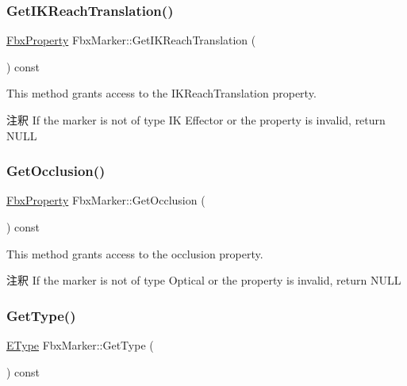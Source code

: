 \subsubsection{\texorpdfstring{Get\+I\+K\+Reach\+Translation()}{GetIKReachTranslation()}}
{\footnotesize\ttfamily \hyperlink{class_fbx_property}{Fbx\+Property} Fbx\+Marker\+::\+Get\+I\+K\+Reach\+Translation (\begin{DoxyParamCaption}{ }\end{DoxyParamCaption}) const}

This method grants access to the I\+K\+Reach\+Translation property. \begin{DoxyRemark}{注釈}
If the marker is not of type IK Effector or the property is invalid, return N\+U\+LL 
\end{DoxyRemark}
\mbox{\label{class_fbx_marker_a8ffa4c00aae9d7f23e1c133dd7520c3e}} 
\subsubsection{\texorpdfstring{Get\+Occlusion()}{GetOcclusion()}}
{\footnotesize\ttfamily \hyperlink{class_fbx_property}{Fbx\+Property} Fbx\+Marker\+::\+Get\+Occlusion (\begin{DoxyParamCaption}{ }\end{DoxyParamCaption}) const}

This method grants access to the occlusion property. \begin{DoxyRemark}{注釈}
If the marker is not of type Optical or the property is invalid, return N\+U\+LL 
\end{DoxyRemark}
\mbox{\label{class_fbx_marker_a2e56a2327718ba1d00f945f757334c91}} 
\subsubsection{\texorpdfstring{Get\+Type()}{GetType()}}
{\footnotesize\ttfamily \hyperlink{class_fbx_marker_ad1e38753dce9a2212df0364466d9f617}{E\+Type} Fbx\+Marker\+::\+Get\+Type (\begin{DoxyParamCaption}{ }\end{DoxyParamCaption}) const}

